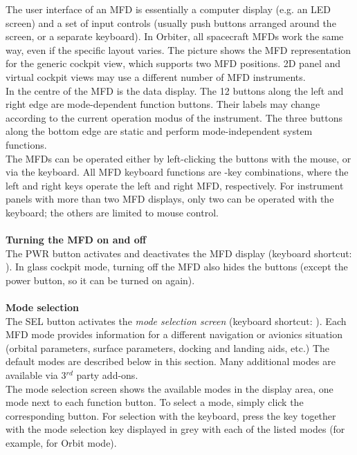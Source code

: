 \documentclass[Orbiter User Manual.tex]{subfiles}
\begin{document}
\noindent
The user interface of an MFD is essentially a computer display (e.g. an LED screen) and a set of input controls (usually push buttons arranged around the screen, or a separate keyboard). In Orbiter, all spacecraft MFDs work the same way, even if the specific layout varies. The picture shows the MFD representation for the generic cockpit view, which supports two MFD positions. 2D panel and virtual cockpit views may use a different number of MFD instruments.\\
In the centre of the MFD is the data display. The 12 buttons along the left and right edge are mode-dependent function buttons. Their labels may change according to the current operation modus of the instrument. The three buttons along the bottom edge are static and perform mode-independent system functions.\\
The MFDs can be operated either by left-clicking the buttons with the mouse, or via the keyboard. All MFD keyboard functions are \Shift-key combinations, where the left and right \Shift keys operate the left and right MFD, respectively. For instrument panels with more than two MFD displays, only two can be operated with the keyboard; the others are limited to mouse control.\\
\\
\textbf{Turning the MFD on and off}\\
The PWR button activates and deactivates the MFD display (keyboard shortcut: \Shift{}). In glass cockpit mode, turning off the MFD also hides the buttons (except the power button, so it can be turned on again).\\
\\
\textbf{Mode selection}\\
The SEL button activates the \textit{mode selection screen} (keyboard shortcut: \Shift{}). Each MFD mode provides information for a different navigation or avionics situation (orbital parameters, surface parameters, docking and landing aids, etc.) The default modes are described below in this section. Many additional modes are available via 3$^{rd}$ party add-ons.\\
The mode selection screen shows the available modes in the display area, one mode next to each function button. To select a mode, simply click the corresponding button. For selection with the keyboard, press the \Shift key together with the mode selection key displayed in grey with each of the listed modes (for example, \Shift{} for Orbit mode).
\end{document}
